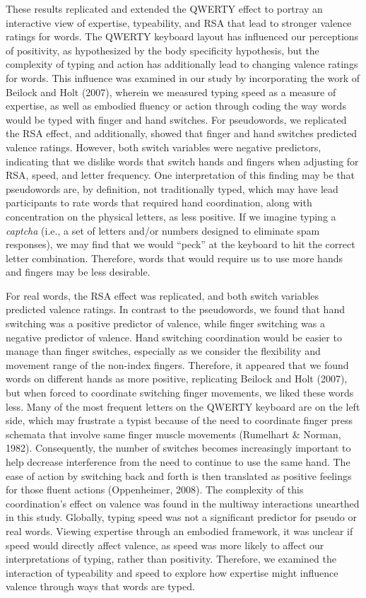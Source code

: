 \documentclass[
  english,
  man,mask]{apa7}
\begin{document}
These results replicated and extended the QWERTY effect to portray an interactive view of expertise, typeability, and RSA that lead to stronger valence ratings for words. The QWERTY keyboard layout has influenced our perceptions of positivity, as hypothesized by the body specificity hypothesis, but the complexity of typing and action has additionally lead to changing valence ratings for words. This influence was examined in our study by incorporating the work of Beilock and Holt (2007), wherein we measured typing speed as a measure of expertise, as well as embodied fluency or action through coding the way words would be typed with finger and hand switches. For pseudowords, we replicated the RSA effect, and additionally, showed that finger and hand switches predicted valence ratings. However, both switch variables were negative predictors, indicating that we dislike words that switch hands and fingers when adjusting for RSA, speed, and letter frequency. One interpretation of this finding may be that pseudowords are, by definition, not traditionally typed, which may have lead participants to rate words that required hand coordination, along with concentration on the physical letters, as less positive. If we imagine typing a \emph{captcha} (i.e., a set of letters and/or numbers designed to eliminate spam responses), we may find that we would ``peck'' at the keyboard to hit the correct letter combination. Therefore, words that would require us to use more hands and fingers may be less desirable.

For real words, the RSA effect was replicated, and both switch variables predicted valence ratings. In contrast to the pseudowords, we found that hand switching was a positive predictor of valence, while finger switching was a negative predictor of valence. Hand switching coordination would be easier to manage than finger switches, especially as we consider the flexibility and movement range of the non-index fingers. Therefore, it appeared that we found words on different hands as more positive, replicating Beilock and Holt (2007), but when forced to coordinate switching finger movements, we liked these words less. Many of the most frequent letters on the QWERTY keyboard are on the left side, which may frustrate a typist because of the need to coordinate finger press schemata that involve same finger muscle movements (Rumelhart \& Norman, 1982). Consequently, the number of switches becomes increasingly important to help decrease interference from the need to continue to use the same hand. The ease of action by switching back and forth is then translated as positive feelings for those fluent actions (Oppenheimer, 2008). The complexity of this coordination's effect on valence was found in the multiway interactions unearthed in this study. Globally, typing speed was not a significant predictor for pseudo or real words. Viewing expertise through an embodied framework, it was unclear if speed would directly affect valence, as speed was more likely to affect our interpretations of typing, rather than positivity. Therefore, we examined the interaction of typeability and speed to explore how expertise might influence valence through ways that words are typed.
\end{document}
